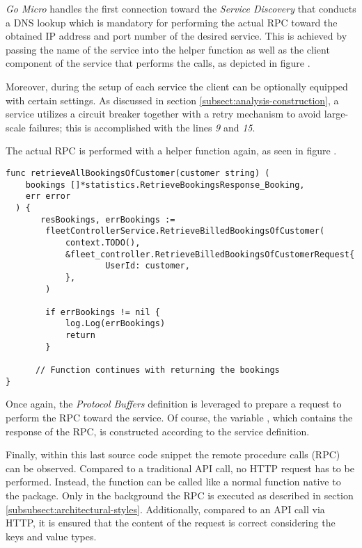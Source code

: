 \documentclass[12pt,a4paper,twoside]{report}
\begin{document}
\textit{Go Micro} handles the first connection toward the
\textit{Service Discovery} that conducts a DNS lookup which is mandatory
for performing the actual RPC toward the obtained IP address and port number
of the desired service.
This is achieved by passing the name of the service into the helper function
as well as the client component of the service that performs the calls, as depicted
in figure .

Moreover, during the setup of each service the client can be optionally equipped
with certain settings. As discussed in section \ref{subsect:analysis-construction},
a service utilizes a circuit breaker together with a retry mechanism to
avoid large-scale failures; this is accomplished with
the lines \textit{9} and \textit{15}.

The actual RPC is performed with a helper function again, as seen
in figure .

\begin{lstlisting}[title=services/statistics/bookings.go, float, floatplacement=H]
func retrieveAllBookingsOfCustomer(customer string) (
    bookings []*statistics.RetrieveBookingsResponse_Booking,
    err error
  ) {
	   resBookings, errBookings :=
        fleetControllerService.RetrieveBilledBookingsOfCustomer(
            context.TODO(),
            &fleet_controller.RetrieveBilledBookingsOfCustomerRequest{
    		        UserId: customer,
    	    },
        )

    	if errBookings != nil {
    		log.Log(errBookings)
    		return
    	}

      // Function continues with returning the bookings
}
\end{lstlisting}

Once again, the \textit{Protocol Buffers} definition is leveraged to prepare
a request to perform the RPC toward the  service.
Of course, the variable , which contains the response of the RPC,
is constructed according to the service definition.

Finally, within this last source code snippet the remote procedure calls (RPC)
can be observed. Compared to a traditional API call, no HTTP request has to be
performed. Instead, the function 
can be called like a normal function native to the package.
Only in the background the RPC is executed as described
in section \ref{subsubsect:architectural-styles}.
Additionally, compared to an API call via HTTP, it is ensured that the content
of the request is correct considering the keys and value types.
\end{document}
